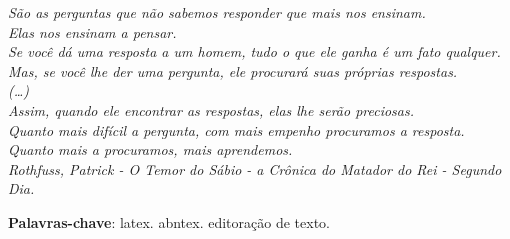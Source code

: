 \documentclass[
	12pt,				%
	oneside,
	a4paper,			%
	english,			%
	german,				%
	brazil				%
	]{abntex2}
\begin{document}



\begin{epigrafe}
    \vspace*{\fill}
	\begin{flushright}
		\textit{São as perguntas que não sabemos responder que mais nos ensinam. \\
		Elas nos ensinam a pensar. \\
		Se você dá uma resposta a um homem, tudo o que ele ganha é um fato qualquer. \\
		Mas, se você lhe der uma pergunta, ele procurará suas próprias respostas. \\
		(…) \\
        Assim, quando ele encontrar as respostas, elas lhe serão preciosas. \\
        Quanto mais difícil a pergunta, com mais empenho procuramos a resposta. \\
        Quanto mais a procuramos, mais aprendemos. \\
        Rothfuss, Patrick - O Temor do Sábio - a Crônica do Matador do Rei - Segundo Dia.}
	\end{flushright}
\end{epigrafe}


\setlength{\absparsep}{18pt} %
\begin{resumo}
\lipsum[1]
 \textbf{Palavras-chave}: latex. abntex. editoração de texto.
\end{resumo}
\end{document}
